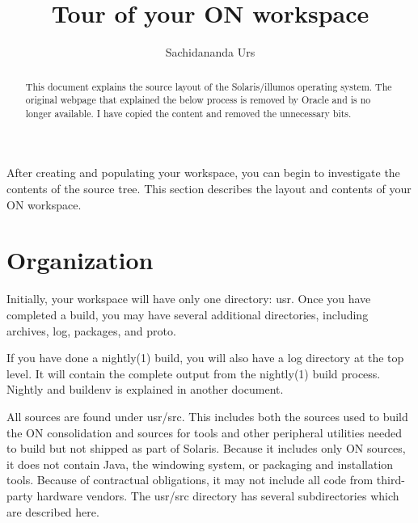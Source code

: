 \documentclass{article}
\author{Sachidananda Urs}
\date{}
\title{Tour of your ON workspace}
\begin{document}
\maketitle

\begin{abstract}
  This document explains the source layout of the Solaris/illumos operating
  system. The original webpage that explained the below process is removed by
  Oracle and is no longer available. I have copied the content and removed the
  unnecessary bits.
\end{abstract}

After creating and populating your workspace, you can begin to investigate the
contents of the source tree. This section describes the layout and contents of
your ON workspace.

\section*{Organization}
Initially, your workspace will have only one directory: usr. Once you have
completed a build, you may have several additional directories, including
archives, log, packages, and proto.

If you have done a nightly(1) build, you will also have a log directory at the
top level. It will contain the complete output from the nightly(1) build
process. Nightly and buildenv is explained in another document.

All sources are found under usr/src. This includes both the sources used to
build the ON consolidation and sources for tools and other peripheral utilities
needed to build but not shipped as part of Solaris. Because it includes only ON
sources, it does not contain Java, the windowing system, or packaging and
installation tools. Because of contractual obligations, it may not include all
code from third-party hardware vendors. The usr/src directory has several
subdirectories which are described here.
\end{document}
